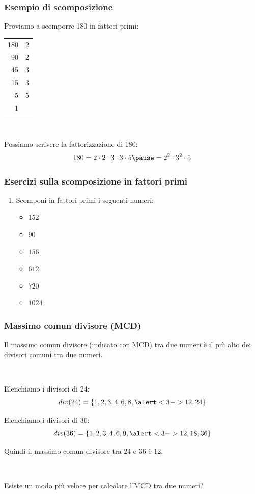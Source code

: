 \documentclass[]{beamer}
\theoremstyle{plain}
\begin{document}
\begin{frame}
\frametitle{Esempio di scomposizione}
Proviamo a scomporre 180 in fattori primi:
\begin{table}[]
  \begin{tabular}{r|l}
  180\pause\pause & 2\pause \\
  90 \pause & 2\pause \\
  45 \pause & 3\pause \\
  15 \pause & 3\pause \\
  5  \pause & 5\pause \\
  1   &  
  \end{tabular}\pause

  ~

  Possiamo scrivere la fattorizzazione di 180:
  \[ 180 = 2 \cdot 2 \cdot 3 \cdot 3 \cdot 5 \pause= 2^2 \cdot 3^2 \cdot 5 \]
  \end{table}
\end{frame}


\begin{frame}
\frametitle{Esercizi sulla scomposizione in fattori primi}
\begin{enumerate}
  \item Scomponi in fattori primi i seguenti numeri:
  \begin{multicols}{2}
    \begin{itemize}
        \item $ 152 $
        \item $ 90 $
        \item $ 156 $
        \item $ 612 $
        \item $ 720 $
        \item $ 1024 $
    \end{itemize}
  \end{multicols}
\end{enumerate}
\end{frame}


\begin{frame}
\frametitle{Massimo comun divisore (MCD)}
Il massimo comun divisore (indicato con MCD) tra due numeri è \alert{il più alto dei divisori comuni tra due numeri}.\pause

~

Elenchiamo i divisori di 24:
\[div(24) = \{ 1, 2, 3, 4, 6, 8, \alert<3->{12}, 24 \}\]\pause

Elenchiamo i divisori di 36:
\[div(36) = \{ 1, 2, 3, 4, 6, 9, \alert<3->{12}, 18, 36 \}\]\pause

Quindi il massimo comun divisore tra 24 e 36 è 12.\pause

~

Esiste un modo più veloce per calcolare l'MCD tra due numeri?
\end{frame}
\end{document}
